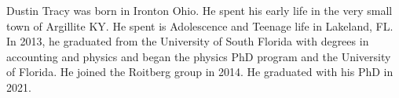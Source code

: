 Dustin Tracy was born in Ironton Ohio.
He spent his early life in the very small town of Argillite KY.
He spent is Adolescence and Teenage life in Lakeland, FL.
In 2013, he graduated from the University of South Florida with degrees in accounting and physics and began the physics PhD program and the University of Florida.
He joined the Roitberg group in 2014.
He graduated with his PhD in 2021.
